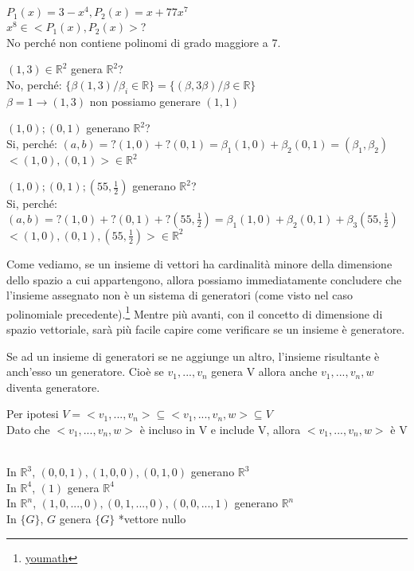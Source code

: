 \begin{es}
	$P_1(x)=3-x^4, P_2(x)=x+77x^7$\\
	$x^8\in<P_1(x),P_2(x)>$?\\
	No perché non contiene polinomi di grado maggiore a 7.
\end{es}
\begin{es}
	$(1,3)\in\mathbb{R}^2$ genera $\mathbb{R}^2$?\\
	No, perché: $\{\beta(1,3)/\beta_i\in\mathbb{R}\}=\{(\beta,3\beta)/\beta\in\mathbb{R}\}$\\
	$\beta=1\rightarrow(1,3)$ non possiamo generare $(1,1)$
\end{es}
\begin{es}
	$(1,0);(0,1)$ generano $\mathbb{R}^2$?\\
	Si, perché: $(a,b)=?(1,0)+?(0,1)=\beta_1(1,0)+\beta_2(0,1)=(\beta_1,\beta_2)$\\
	$<(1,0),(0,1)>\in\mathbb{R}^2$
\end{es}
\begin{es}
	$(1,0);(0,1);(55,\frac{1}{2})$ generano $\mathbb{R}^2$?\\
	Si, perché: $(a,b)=?(1,0)+?(0,1)+?(55,\frac{1}{2})=\beta_1(1,0)+\beta_2(0,1)+\beta_3(55,\frac{1}{2})$\\
	$<(1,0),(0,1),(55,\frac{1}{2})>\in\mathbb{R}^2$
\end{es}

Come vediamo, se un insieme di vettori ha cardinalità minore della dimensione dello spazio a cui appartengono, allora possiamo immediatamente concludere che l'insieme assegnato non è un sistema di generatori (come visto nel caso polinomiale precedente).\footnote{\href{https://www.youmath.it/lezioni/algebra-lineare/matrici-e-vettori/678-sistema-di-generatori-di-uno-spazio-vettoriale.html}{youmath}} Mentre più avanti, con il concetto di dimensione di spazio vettoriale, sarà più facile capire come verificare se un insieme è generatore.

\begin{nota}
	Se ad un insieme di generatori se ne aggiunge un altro, l'insieme risultante è anch'esso un generatore. Cioè se $v_1,...,v_n$ genera V allora anche $v_1,...,v_n,w$ diventa generatore.
	\begin{dimostrazione}
		Per ipotesi $V=<v_1,...,v_n>\subseteq<v_1,...,v_n,w>\subseteq V$\\
		Dato che $<v_1,...,v_n,w>$ è incluso in V e include V, allora $<v_1,...,v_n,w>$ è V\\
		\begin{es}
			\phantom{}\\
			In $\mathbb{R}^3$, $(0,0,1),(1,0,0),(0,1,0)$ generano $\mathbb{R}^3$\\
			In $\mathbb{R}^4$, $(1)$ genera $\mathbb{R}^4$\\
			In $\mathbb{R}^n$, $(1,0,...,0),(0,1,...,0),(0,0,...,1)$ generano $\mathbb{R}^n$\\
			In $\{G\}$, $G$ genera $\{G\}$ *vettore nullo
		\end{es}
	\end{dimostrazione}
\end{nota}


